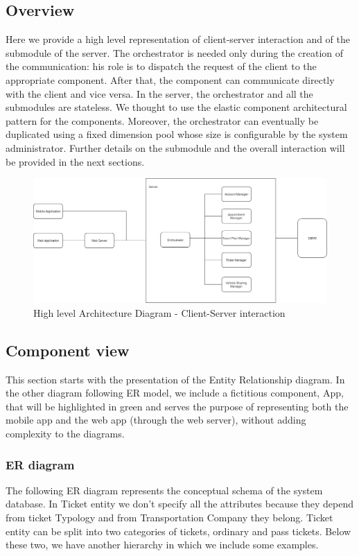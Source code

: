 \subsection{Overview}
	Here we provide a high level representation of client-server interaction and of the submodule of the server.
	The orchestrator is needed only during the creation of the communication: his role is to dispatch the request of the client to the appropriate component. After that, the component can communicate directly with the client and vice versa.\newline
	In the server, the orchestrator and all the submodules are stateless. We thought to use the elastic component architectural pattern for the components. Moreover, the orchestrator can eventually be duplicated using a fixed dimension pool whose size is configurable by the system administrator.\newline
	Further details on the submodule and the overall interaction will be provided in the next sections.

	\begin{figure}[H]
		\centerline{\includegraphics[width=0.9\paperwidth]{Images/HighLevelArchitecture}}
		\caption{High level Architecture Diagram - Client-Server interaction}
	\end{figure}

\filbreak
\subsection{Component view}
	This section starts with the presentation of the Entity Relationship diagram. In the other diagram following ER model, we include a fictitious component, App, that will be highlighted in green and serves the purpose of representing both the mobile app and the web app (through the web server), without adding complexity to the diagrams.
	\subsubsection{ER diagram}
	The following ER diagram represents the conceptual schema of the system database. In Ticket entity we don't specify all the attributes because they depend from ticket Typology and from Transportation Company they belong. Ticket entity can be split into two categories of tickets, ordinary and pass tickets. Below these two, we have another hierarchy in which we include some examples.
	
